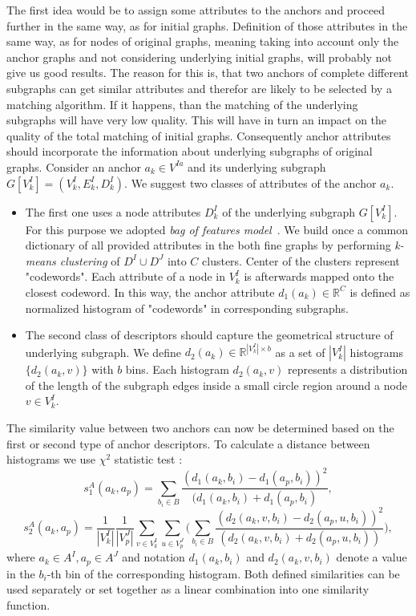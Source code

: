 The first idea would be to assign some attributes to the anchors and proceed further in the same way, as for initial graphs. Definition of those attributes in the same way, as for nodes of original graphs, meaning taking into account only the anchor graphs and not considering underlying initial graphs, will probably not give us good results. The reason for this is, that two anchors of complete different subgraphs can get similar attributes and therefor are likely to be selected by a matching algorithm. If it happens, than the matching of the underlying subgraphs will have very low quality. This will have in turn an impact on the quality of the total matching of initial graphs. Consequently anchor attributes should incorporate the information about underlying subgraphs of original graphs.
Consider an anchor $a_k\in V^{Ia}$ and its underlying subgraph $G[V^I_k]=(V^I_k,E^I_k,D^I_k)$. We suggest two classes of attributes of the anchor $a_k$. 
\begin{itemize}
\item The first one uses a node attributes $D^I_k$ of the underlying subgraph $G[V^I_k]$. For this purpose we adopted \emph{bag of features model}~\cite{BoF_Leung2001}. We build once a common dictionary of all provided attributes in the both fine graphs by performing \emph{k-means clustering} of $D^I\cup D^J$ into $C$ clusters. Center of the clusters represent "codewords". Each attribute of a node in $V^I_k$ is afterwards mapped onto the closest codeword. In this way, the anchor attribute $d_1(a_k)\in\mathbb{R}^C$ is defined as normalized histogram of "codewords" in corresponding subgraphs.

\item The second class of descriptors should capture the geometrical structure of underlying subgraph. We define $d_2(a_k)\in\mathbb{R}^{|V^I_k|\times b}$ as a set of $|V^I_k|$ histograms $\{d_2(a_k,v)\}$ with $b$ bins. Each histogram $d_2(a_k,v)$ represents a distribution of the length of the subgraph edges inside a small circle region around a node $v\in V^I_k$. 
\end{itemize}
The similarity value between two anchors can now be determined based on the first or second type of anchor descriptors. To calculate a distance between histograms we use $\chi^2$ statistic test \cite{Weken2004_ChiSqTest}:
\begin{equation}
s^A_1(a_k, a_p) = \sum_{b_i\in B}\frac{(d_1(a_k,b_i)-d_1(a_p,b_i))^2}{(d_1(a_k,b_i)+d_1(a_p,b_i)},
\end{equation}
\begin{equation}
s^A_2(a_k, a_p) = \frac{1}{|V^I_k|}\frac{1}{|V^J_p|}\sum_{v\in V^I_k}\sum_{u\in V^J_p} \big(\sum_{b_i\in B}\frac{(d_2(a_k,v,b_i)-d_2(a_p,u,b_i))^2}{(d_2(a_k,v,b_i)+d_2(a_p,u,b_i))}\big),
\end{equation}
where $a_k\in A^I, a_p\in A^J$ and notation $d_1(a_k,b_i)$ and $d_2(a_k,v,b_i)$ denote a value in the $b_i$-th bin of the corresponding histogram. 
Both defined similarities can be used separately or set together as a linear combination into one similarity function.

